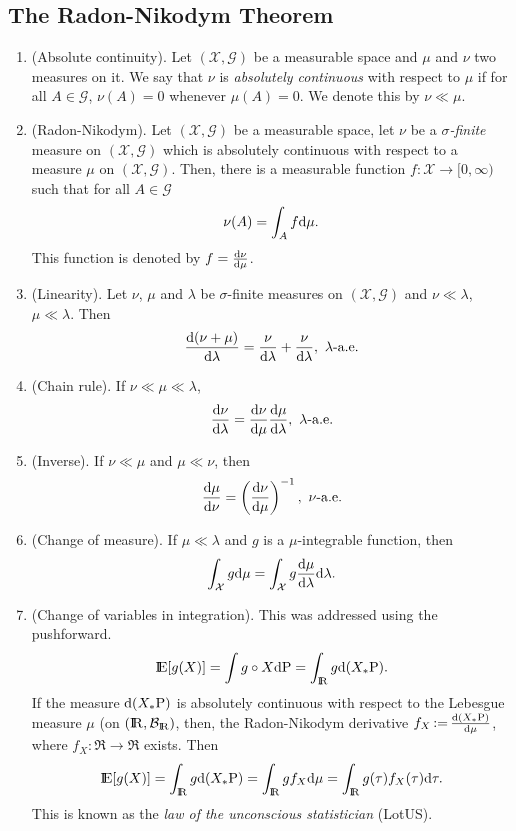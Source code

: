 \documentclass[a4paper,10pt]{article}
\begin{document}
\subsection{The Radon-Nikodym Theorem}
\begin{enumerate}
 \item (Absolute continuity).
       Let $(\mathcal{X}, \mathscr{G})$ be a measurable space and $\mu$ and $\nu$ two measures on it.
       We say that $\nu$ is \textit{absolutely continuous} with respect to $\mu$ if
       for all $A\in\mathscr{G}$, $\nu(A)=0$ whenever $\mu(A)=0$. We denote this by $\nu\ll\mu$.
 \item (Radon-Nikodym). Let $(\mathcal{X}, \mathscr{G})$ be a measurable space, let $\nu$ be a \textit{$\sigma$-finite}
       measure on $(\mathcal{X}, \mathscr{G})$ which is {absolutely continuous} with respect 
       to a measure $\mu$ on $(\mathcal{X}, \mathscr{G})$. Then, there is a measurable function $f:\mathcal{X}\to[0,\infty)$
       such that for all $A\in \mathcal{G}$
       \[
        \nu(A) = \int_A f \mathrm{d} \mu.
       \]
      This function is denoted by $f=\frac{\mathrm{d}\nu}{\mathrm{d} \mu}$.
 \item (Linearity). Let $\nu$, $\mu$ and $\lambda$ be $\sigma$-finite measures on $(\mathcal{X}, \mathscr{G})$ and $\nu\ll\lambda$, $\mu\ll\lambda$.
       Then
       \[
        \frac{\d(\nu+\mu)}{\d \lambda} = \frac{\nu}{\d \lambda} + \frac{\nu}{\d \lambda},\ \lambda\text{-a.e.}
       \]
 \item (Chain rule). If $\nu\ll\mu\ll\lambda$,
 \[
  \frac{\d\nu}{\d\lambda} = \frac{\d\nu}{\d\mu} \frac{\d\mu}{\d\lambda},\ \lambda\text{-a.e.} 
 \]
 \item (Inverse). If $\nu\ll\mu$ and $\mu\ll\nu$, then
 \[
  \frac{\mathrm{d} \mu}{\mathrm{d} \nu} = \left( \frac{\mathrm{d} \nu}{\mathrm{d} \mu}\right)^{-1},\ \nu\text{-a.e.}
 \]
 \item (Change of measure).
 If $\mu\ll\lambda$ and $g$ is a $\mu$-integrable function, then
 \[
  \int_{\mathcal{X}} g \mathrm{d} \mu = \int_{\mathcal{X}} g \frac{\mathrm{d} \mu}{\mathrm{d} \lambda}\mathrm{d} \lambda.
 \]
 \item (Change of variables in integration). This was addressed using the pushforward. 
 \[
  \E[g(X)] = \int g\circ X\d\prob = \int_\Re g \d(X_*\prob).
 \]
 If the measure $\mathrm{d}(X_*\mathrm{P})$ is absolutely continuous with respect to the Lebesgue 
 measure $\mu$ (on $(\Re, \B_\Re)$, then, the Radon-Nikodym derivative $f_X{}\mathop{\mathrel{:}=}{} \frac{\mathrm{d}(X_*\mathrm{P})}{\mathrm{d} \mu}$,
 where $f_X:\Re\to\Re$ exists. Then
 \[
  \E[g(X)] = \int_\Re g \d(X_*\prob) = \int_\Re g f_X \d\mu = \int_\Re g(\tau)f_X(\tau)\d \tau.
 \]
 This is known as the \textit{law of the unconscious statistician} (LotUS).

\end{enumerate}
\end{document}
